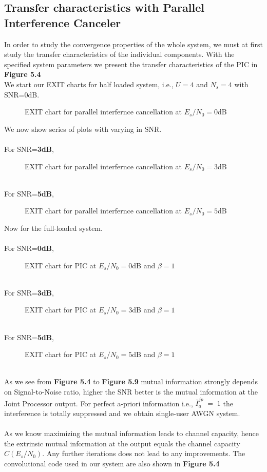 \subsection{Transfer characteristics with Parallel Interference Canceler}
In order to study the convergence properties of the whole system, we must at first study the transfer characteristics of the individual components. With the specified system parameters we present the transfer characteristics of the PIC in \textbf{Figure 5.4} \\
We start our EXIT charts for half loaded system, i.e., $U=4$ and $N_s=4$ with SNR=0dB.
\begin{figure*}[htb]
\centerline{ }
\caption{EXIT chart for parallel interfernce cancellation at $E_s/N_0=0$dB}
\end{figure*} 
\newpage
We now show series of plots with varying in SNR. \\ \\
For SNR=\textbf{3dB},
\begin{figure*}[htb]
\centerline{ }
\caption{EXIT chart for parallel interfernce cancellation at $E_s/N_0=3$dB}
\end{figure*}\\
For SNR=\textbf{5dB},
\begin{figure*}[htb]
\centerline{ }
\caption{EXIT chart for parallel interfernce cancellation at $E_s/N_0=5$dB}
\end{figure*}
\newpage
Now for the full-loaded system.\\\\
For SNR=\textbf{0dB},
\begin{figure*}[htb]
\centerline{ }
\caption{EXIT chart for PIC at $E_s/N_0=0$dB and $\beta=1$}
\end{figure*}\\
For SNR=\textbf{3dB},
\begin{figure*}[htb]
\centerline{ }
\caption{EXIT chart for PIC at $E_s/N_0=3$dB and $\beta=1$}
\end{figure*}\\
\newpage
For SNR=\textbf{5dB},
\begin{figure*}[htb]
\centerline{ }
\caption{EXIT chart for PIC at $E_s/N_0=5$dB and $\beta=1$}
\end{figure*}\\
As we see from \textbf{Figure 5.4} to \textbf{Figure 5.9} mutual information strongly depends on Signal-to-Noise ratio, higher the SNR better is the mutual information at the Joint Processor output. For perfect a-priori information i.e., $\bar{I}_a^{jp}\;=\;1$ the interference is totally suppressed and we obtain single-user AWGN system.\\ \\
As we know maximizing the mutual information leads to channel capacity, hence the extrinsic mutual information at the output equals the channel capacity $C(E_s/N_0)$. Any further iterations does not lead to any improvements.
The convolutional code used in our system are also shown in \textbf{Figure 5.4}
\newpage
